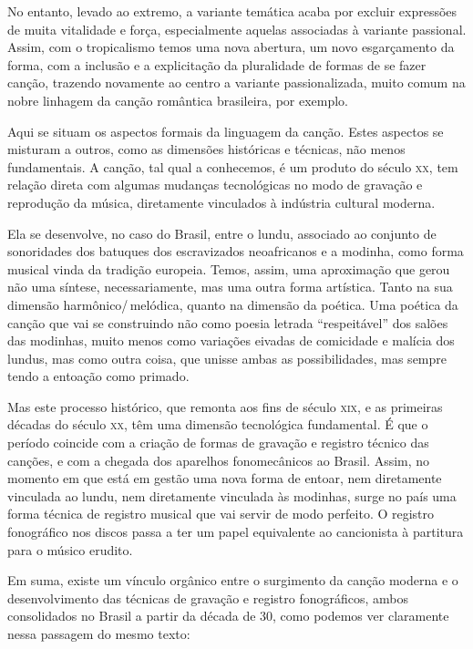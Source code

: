 No entanto, levado ao extremo, a variante temática acaba por excluir
expressões de muita vitalidade e força, especialmente aquelas associadas
à variante passional. Assim, com o tropicalismo temos uma nova abertura,
um novo esgarçamento da forma, com a inclusão e a explicitação da
pluralidade de formas de se fazer canção, trazendo novamente ao centro a
variante passionalizada, muito comum na nobre linhagem da canção
romântica brasileira, por exemplo.

Aqui se situam os aspectos formais da linguagem da canção. Estes
aspectos se misturam a outros, como as dimensões históricas e técnicas,
não menos fundamentais. A canção, tal qual a conhecemos, é um produto do
século \textsc{xx}, tem relação direta com algumas mudanças tecnológicas no modo
de gravação e reprodução da música, diretamente vinculados à indústria
cultural moderna.

Ela se desenvolve, no caso do Brasil, entre o lundu, associado ao
conjunto de sonoridades dos batuques dos escravizados neoafricanos e a
modinha, como forma musical vinda da tradição europeia. Temos, assim,
uma aproximação que gerou não uma síntese, necessariamente, mas uma
outra forma artística. Tanto na sua dimensão harmônico/\,melódica, quanto
na dimensão da poética. Uma poética da canção que vai se construindo não
como poesia letrada ``respeitável'' dos salões das modinhas, muito menos
como variações eivadas de comicidade e malícia dos lundus, mas como
outra coisa, que unisse ambas as possibilidades, mas sempre tendo a
entoação como primado.

Mas este processo histórico, que remonta aos fins de século \textsc{xix}, e as
primeiras décadas do século \textsc{xx}, têm uma dimensão tecnológica
fundamental. É que o período coincide com a criação de formas de
gravação e registro técnico das canções, e com a chegada dos aparelhos
fonomecânicos ao Brasil. Assim, no momento em que está em gestão uma
nova forma de entoar, nem diretamente vinculada ao lundu, nem
diretamente vinculada às modinhas, surge no país uma forma técnica de
registro musical que vai servir de modo perfeito. O registro fonográfico
nos discos passa a ter um papel equivalente ao cancionista à partitura
para o músico erudito.

Em suma, existe um vínculo orgânico entre o surgimento da canção moderna
e o desenvolvimento das técnicas de gravação e registro fonográficos,
ambos consolidados no Brasil a partir da década de 30, como podemos ver
claramente nessa passagem do mesmo texto:

